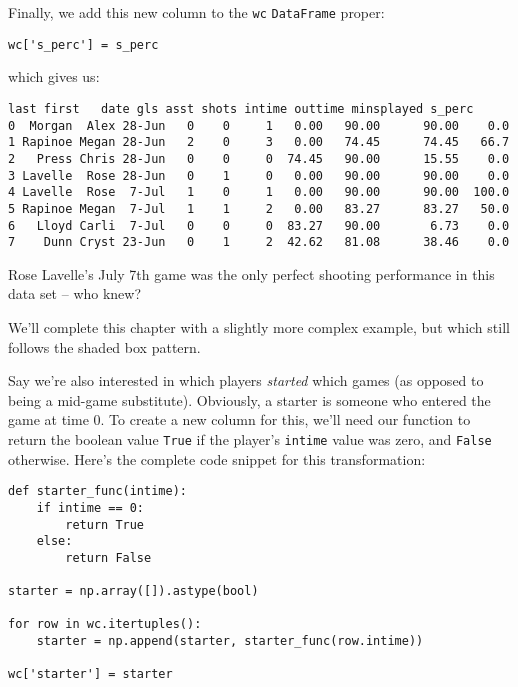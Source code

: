Finally, we add this new column to the \texttt{wc} \texttt{DataFrame} proper:

\begin{Verbatim}[fontsize=\small,samepage=true,frame=single,framesep=3mm]
wc['s_perc'] = s_perc
\end{Verbatim}

which gives us:

\begin{Verbatim}[fontsize=\scriptsize,samepage=true,frame=leftline,framesep=5mm,framerule=1mm]
     last first   date gls asst shots intime outtime minsplayed s_perc
0  Morgan  Alex 28-Jun   0    0     1   0.00   90.00      90.00    0.0
1 Rapinoe Megan 28-Jun   2    0     3   0.00   74.45      74.45   66.7
2   Press Chris 28-Jun   0    0     0  74.45   90.00      15.55    0.0
3 Lavelle  Rose 28-Jun   0    1     0   0.00   90.00      90.00    0.0
4 Lavelle  Rose  7-Jul   1    0     1   0.00   90.00      90.00  100.0
5 Rapinoe Megan  7-Jul   1    1     2   0.00   83.27      83.27   50.0
6   Lloyd Carli  7-Jul   0    0     0  83.27   90.00       6.73    0.0
7    Dunn Cryst 23-Jun   0    1     2  42.62   81.08      38.46    0.0
\end{Verbatim}

Rose Lavelle's July 7th game was the only perfect shooting performance in this
data set -- who knew?

\bigskip

We'll complete this chapter with a slightly more complex example, but which
still follows the shaded box pattern.

Say we're also interested in which players \textit{started} which games (as
opposed to being a mid-game substitute). Obviously, a starter is someone who
entered the game at time 0. To create a new column for this, we'll need our
function to return the boolean value \texttt{True} if the player's
\texttt{intime} value was zero, and \texttt{False} otherwise. Here's
the complete code snippet for this transformation:

\begin{Verbatim}[fontsize=\small,samepage=true,frame=single,framesep=3mm]
def starter_func(intime):
    if intime == 0:
        return True
    else:
        return False

starter = np.array([]).astype(bool)

for row in wc.itertuples():
    starter = np.append(starter, starter_func(row.intime))

wc['starter'] = starter
\end{Verbatim}
\vspace{-.2in}

